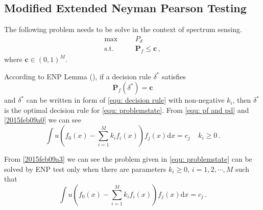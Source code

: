 
\subsection{Modified Extended Neyman Pearson Testing}

\def \JUDGEMENT{u(f_0(x) - \sum_{j=1}^{M}k_j f_j(x))}

The following problem needs to be solve in the context of spectrum sensing. 
      \begin{equation}
      \label{equ: problemstate}
      \begin{split}
      \max\;\;\;\;\;\;&P_d\\
      \text{s.t.}\;\;\;\;\;\;&\mathbf{P}_f \leq \mathbf{c}\,,
      \end{split}
      \end{equation}
where $\mathbf{c} \in (0, 1)^M$.

According to ENP Lemma (), if a decision rule $\delta^\ast$ satisfies 
\begin{equation}
  \label{2015feb09a0}
  \mathbf{P}_f(\delta^\ast) = \mathbf{c}
\end{equation}
and $\delta^\ast$ can be written in form of \eqref{equ: decision rule} with non-negative $k_i$, 
then $\delta^\ast$ is the optimal decision rule for \eqref{equ: problemstate}. From \eqref{equ: pf and pd}  and \eqref{2015feb09a0} we can see 
\begin{equation}
\int u(f_0(x) - \sum_{i=1}^{M}k_if_i(x))f_j(x)\mathrm{d}x = c_j\;\;\;\;k_i \geq 0\,.
\label{2015feb09a3}
\end{equation}

From \eqref{2015feb09a3} we can see the problem given in \eqref{equ: problemstate} can be solved by ENP test only when there are parameters $k_i \geq 0$, $i = 1, 2, \cdots, M$ such that  
\begin{equation}
\int u(f_0(x) - \sum_{i=1}^{M}k_if_i(x))f_j(x)\mathrm{d}x = c_j\,.
\label{equ: condition for ENP}
\end{equation}

